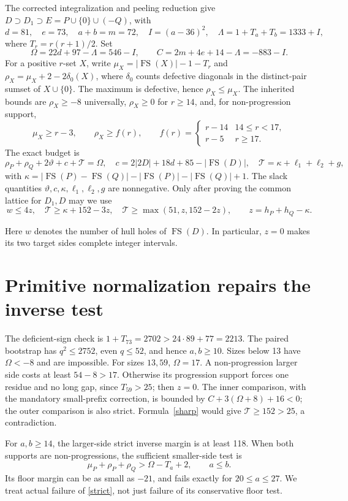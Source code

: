 \documentclass[11pt,a4paper]{article}
\newcommand{\FS}{\operatorname{FS}}\newcommand{\Z}{\mathbb Z}
\newcommand{\T}{\mathcal T}
\begin{document}
The corrected integralization and peeling reduction \cite{foundation,previous}
give $D\supset D_1\supset E=P\cup\{0\}\cup(-Q)$, with
\[
 d=81,\quad e=73,\quad a+b=m=72,\quad I=(a-36)^2,
 \quad\Lambda=1+T_a+T_b=1333+I,
\]
where $T_r=r(r+1)/2$. Set
\[
 \Omega=22d+97-\Lambda=546-I,\qquad
 C=2m+4e+14-\Lambda=-883-I.
\]
For a positive $r$-set $X$, write
$\mu_X=|\FS(X)|-1-T_r$ and $\rho_X=\mu_X+2-2\delta_0(X)$,
where $\delta_0$ counts defective diagonals in the distinct-pair sumset of
$X\cup\{0\}$. The maximum is defective, hence $\rho_X\le\mu_X$.
The inherited bounds are $\rho_X\ge-8$ universally, $\rho_X\ge0$ for
$r\ge14$, and, for non-progression support,
\[
 \mu_X\ge r-3,\qquad \rho_X\ge f(r),\qquad
 f(r)=\begin{cases}r-14&14\le r<17,\\r-5&r\ge17.\end{cases}
\]
The exact budget is
\begin{equation}\label{budget}
 \rho_P+\rho_Q+2\vartheta+c+\T=\Omega,
 \quad c=2|2D|+18d+85-|\FS(D)|,
 \quad\T=\kappa+\ell_1+\ell_2+g,
\end{equation}
with $\kappa=|\FS(P)-\FS(Q)|-|\FS(P)|-|\FS(Q)|+1$.
The slack quantities $\vartheta,c,\kappa,\ell_1,\ell_2,g$ are nonnegative. Only after proving the common lattice for
$D_1,D$ may we use
\begin{equation}\label{sharp}
 w\le4z,\quad \T\ge\kappa+152-3z,\quad
 \T\ge\max(51,z,152-2z),\qquad z=h_P+h_Q-\kappa.
\end{equation}

Here $w$ denotes the number of hull holes of $\FS(D)$. In particular, $z=0$ makes its two target sides complete integer intervals.

\section{Primitive normalization repairs the inverse test}
The deficient-sign check is $1+T_{73}=2702>24\cdot89+77=2213$.
The paired bootstrap has $q^2\le2752$, even $q\le52$, and hence
$a,b\ge10$. Sizes below 13 have $\Omega<-8$ and are impossible.
For sizes $13,59$, $\Omega=17$. A non-progression larger side costs at
least $54-8>17$. Otherwise its progression support forces one residue and
no long gap, since $T_{59}>25$; then $z=0$. The inner comparison, with the
mandatory small-prefix correction, is bounded by $C+3(\Omega+8)+16<0$;
the outer comparison is also strict. Formula~\eqref{sharp} would give
$\T\ge152>25$, a contradiction.

For $a,b\ge14$, the larger-side strict inverse margin is at least 118.
When both supports are non-progressions, the sufficient smaller-side test is
\begin{equation}\label{strict}
 \mu_P+\rho_P+\rho_Q>\Omega-T_a+2,
 \qquad a\le b.
\end{equation}
Its floor margin can be as small as $-21$, and fails exactly for
$20\le a\le27$. We treat actual failure of \eqref{strict}, not just failure
of its conservative floor test.
\end{document}
